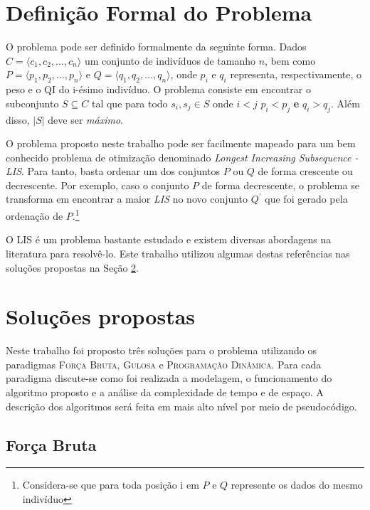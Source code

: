 \documentclass[12pt]{article}
\begin{document}
\section{Definição Formal do Problema}
\label{sec:definicao}

O problema pode ser definido formalmente da seguinte forma. Dados $C=\langle c_1, c_2, \ldots, c_n\rangle$ um conjunto de indivíduos de tamanho $n$, bem como $P=\langle p_1, p_2, \ldots, p_n\rangle$ e $Q=\langle q_1, q_2, \ldots, q_n\rangle$, onde $p_i$ e $q_i$ representa, respectivamente, o peso e o QI do i-ésimo indivíduo. O problema consiste em encontrar o subconjunto $S \subseteq C$ tal que para todo $s_i,s_j\in S $ onde $ i < j$ $ p_i < p_j$  \textbf{e} $q_i > q_j$. Além disso, $|S|$ deve ser \textit{máximo}.

O problema proposto neste trabalho pode ser facilmente mapeado para um bem conhecido problema de otimização denominado \textit{Longest Increasing Subsequence - LIS}{}\cite{knuth2013art}{}. Para tanto, basta ordenar um dos conjuntos $P$ ou $Q$ de forma crescente ou decrescente. Por exemplo, caso o conjunto $P$ de forma decrescente, o problema se transforma em encontrar a maior \textit{LIS} no novo conjunto $Q^{'}$ que foi gerado pela ordenação de $P$.\footnote{Considera-se que para toda posição i em $P$ e $Q$ represente os dados do mesmo indivíduo}

O LIS é um problema bastante estudado e existem diversas abordagens na literatura para resolvê-lo. Este trabalho utilizou algumas destas referências nas soluções propostas na Seção \ref{sec:solucoes}{}.

\section{Soluções propostas}
\label{sec:solucoes}

Neste trabalho foi proposto três soluções para o problema utilizando os paradigmas \textsc{Força Bruta},  \textsc{Gulosa} e \textsc{Programação Dinâmica}{}. Para cada paradigma discute-se como foi realizada a modelagem, o funcionamento do algoritmo proposto e a análise da complexidade de tempo e de espaço. A descrição dos algoritmos será feita em mais alto nível por meio de pseudocódigo.

\subsection{Força Bruta}
\label{subsec:forca_bruta}
\end{document}

